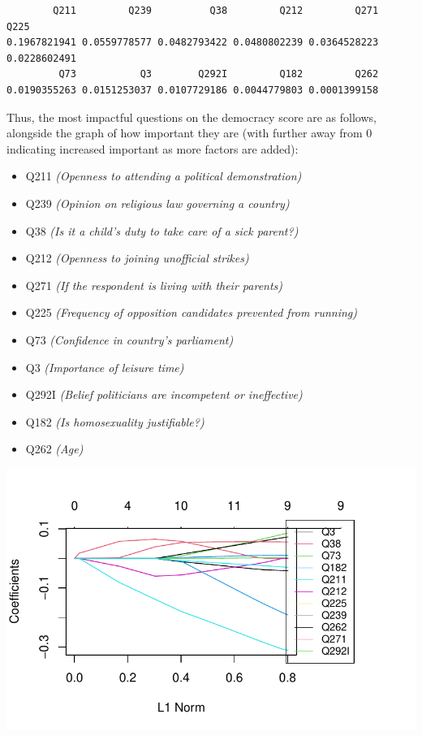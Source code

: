 \documentclass[
  letterpaper,
  DIV=11,
  numbers=noendperiod]{scrartcl}
\providecommand{\tightlist}{%
  \setlength{\itemsep}{0pt}\setlength{\parskip}{0pt}}\usepackage{longtable,booktabs,array}
\begin{document}
\begin{verbatim}
        Q211         Q239          Q38         Q212         Q271         Q225 
0.1967821941 0.0559778577 0.0482793422 0.0480802239 0.0364528223 0.0228602491 
         Q73           Q3        Q292I         Q182         Q262 
0.0190355263 0.0151253037 0.0107729186 0.0044779803 0.0001399158 
\end{verbatim}

Thus, the most impactful questions on the democracy score are as
follows, alongside the graph of how important they are (with further
away from 0 indicating increased important as more factors are added):

\begin{itemize}
\tightlist
\item
  Q211 \emph{(Openness to attending a political demonstration)}
\item
  Q239 \emph{(Opinion on religious law governing a country)}
\item
  Q38 \emph{(Is it a child's duty to take care of a sick parent?)}
\item
  Q212 \emph{(Openness to joining unofficial strikes)}
\item
  Q271 \emph{(If the respondent is living with their parents)}
\item
  Q225 \emph{(Frequency of opposition candidates prevented from
  running)}
\item
  Q73 \emph{(Confidence in country's parliament)}
\item
  Q3 \emph{(Importance of leisure time)}
\item
  Q292I \emph{(Belief politicians are incompetent or ineffective)}
\item
  Q182 \emph{(Is homosexuality justifiable?)}
\item
  Q262 \emph{(Age)}
\end{itemize}

\includegraphics{Episode_2_files/figure-pdf/lassoresults-1.pdf}
\end{document}
